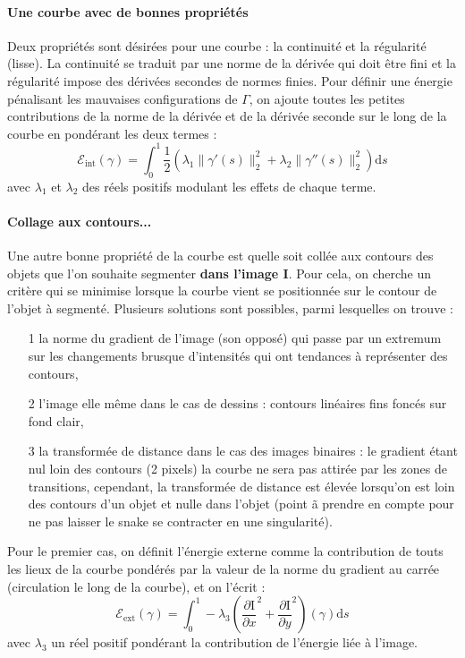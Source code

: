 \documentclass[10pt,a4paper]{article}
\begin{document}
\paragraph{Une courbe avec de bonnes propri\'{e}t\'{e}s} Deux propri\'{e}t\'{e}s sont d\'{e}sir\'{e}es pour une courbe : la continuit\'{e} et la r\'{e}gularit\'{e} (lisse). La continuit\'{e} se traduit par une norme de la d\'{e}riv\'{e}e qui doit \^{e}tre fini et la r\'{e}gularit\'{e} impose des d\'{e}riv\'{e}es secondes de normes finies. Pour d\'{e}finir une \'{e}nergie p\'{e}nalisant les mauvaises configurations de $\Gamma$, on ajoute toutes les petites contributions de la norme de la d\'{e}riv\'{e}e et de la d\'{e}riv\'{e}e seconde sur le long de la courbe en pond\'{e}rant les deux termes : 
\begin{displaymath}
	\mathcal{E}_{\text{int}}(\gamma) = \int_{0}^{1} \frac{1}{2} \left(\lambda_1 \|\gamma'(s) \|_{2}^{2} + \lambda_2 \|\gamma''(s) \|_{2}^{2}\right) \mathrm{d}s
\end{displaymath}
avec $\lambda_1$ et $\lambda_2$ des r\'{e}els positifs modulant les effets de chaque terme.

\paragraph{Collage aux contours...} Une autre bonne propri\'{e}t\'{e} de la courbe est quelle soit coll\'{e}e aux contours des objets que l'on souhaite segmenter \textbf{dans l'image I}. Pour cela, on cherche un crit\`{e}re qui se minimise lorsque la courbe vient se positionn\'{e}e sur le contour de l'objet \`{a} segment\'{e}. Plusieurs solutions sont possibles, parmi lesquelles on trouve : 
\begin{itemize}
	\item[1] la norme du gradient de l'image (son oppos\'{e}) qui passe par un extremum sur les changements brusque d'intensit\'{e}s qui ont tendances \`{a} repr\'{e}senter des contours,
	\item[2] l'image elle m\^{e}me dans le cas de dessins : contours lin\'{e}aires fins fonc\'{e}s sur fond clair,
	\item[3] la transform\'{e}e de distance dans le cas des images binaires : le gradient \'{e}tant nul loin des contours (2 pixels) la courbe ne sera pas attir\'{e}e par les zones de transitions, cependant, la transform\'{e}e de distance est \'{e}lev\'{e}e lorsqu'on est loin des contours d'un objet et nulle dans l'objet (point \~{a} prendre en compte pour ne pas laisser le snake se contracter en une singularit\'{e}).
\end{itemize}
Pour le premier cas, on d\'{e}finit l'\'{e}nergie externe comme la contribution de touts les lieux de la courbe pond\'{e}r\'{e}s par la valeur de la norme du gradient au carr\'{e}e (circulation le long de la courbe), et on l'\'{e}crit : 
\begin{displaymath}
	\mathcal{E}_{\text{ext}}(\gamma) = \int_{0}^{1} - \lambda_3    \left( \frac{\partial \text{I}}{\partial x}^{2} + \frac{\partial \text{I}}{\partial y} ^{2} \right)(\gamma ) \mathrm{d}s
\end{displaymath}
avec $\lambda_3$ un r\'{e}el positif pond\'{e}rant la contribution de l'\'{e}nergie li\'{e}e \`{a} l'image.
\end{document}
